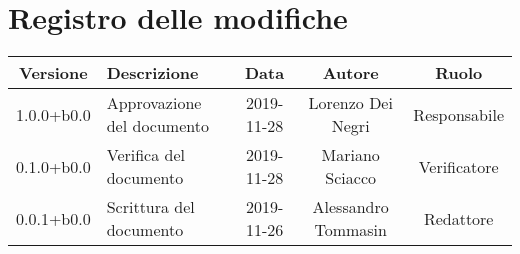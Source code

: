 \section*{Registro delle modifiche}

\begin{center}
	\begin{longtable}{|c|p{3cm}|c|c|c|}
	\hline
	\rowcolor{lighter-grayer}
	\textbf{Versione} & \textbf{Descrizione} & \textbf{Data} & \textbf{Autore} & \textbf{Ruolo} \\
	\hline
	\endfirsthead


	1.0.0+b0.0 & Approvazione del documento & 2019-11-28 & Lorenzo Dei Negri & Responsabile \\
	\hline
	0.1.0+b0.0 & Verifica del documento & 2019-11-28 & Mariano Sciacco & Verificatore \\
	\hline
	0.0.1+b0.0 & Scrittura del documento & 2019-11-26 & Alessandro Tommasin & Redattore \\

	\hline

	\end{longtable}
\end{center}
